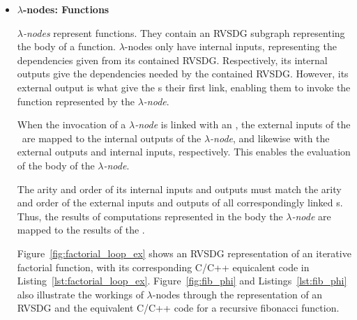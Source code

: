 \begin{itemize}
\item \textbf{$\lambda$-nodes: Functions}

\textit{$\lambda$-nodes} represent functions. They contain an RVSDG subgraph
representing the body of a function. $\lambda$-nodes only have internal
inputs, representing the dependencies given from its contained RVSDG.
Respectively, its internal outputs give the dependencies needed by the contained
RVSDG. However, its external output is what give the \applyNode s their first
link, enabling them to invoke the function represented by the
\textit{$\lambda$-node}.

When the invocation of a \textit{$\lambda$-node} is linked with an \applyNode ,
the external inputs of the \applyNode~are mapped to the internal outputs of the
\textit{$\lambda$-node}, and likewise with the external outputs and internal
inputs, respectively. This enables the evaluation of the body of the
\textit{$\lambda$-node}.

The arity and order of its internal inputs and outputs must match the arity and
order of the external inputs and outputs of all correspondingly linked
\applyNode s. Thus, the results of computations represented in the body the
\textit{$\lambda$-node} are mapped to the results of the \applyNode .

Figure~\ref{fig:factorial_loop_ex} shows an RVSDG representation of an iterative
factorial function, with its corresponding C/C++ equicalent code in
Listing~\ref{lst:factorial_loop_ex}. Figure~\ref{fig:fib_phi} and
Listings~\ref{lst:fib_phi} also illustrate the workings of $\lambda$-nodes
through the representation of an RVSDG and the equivalent C/C++ code for a
recursive fibonacci function.


\end{itemize}
